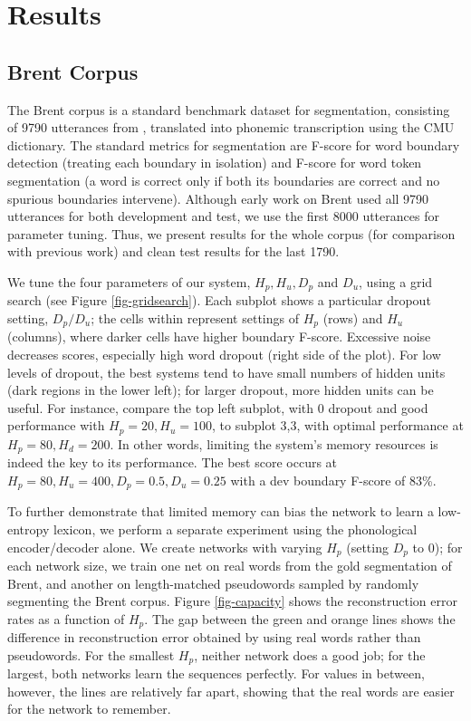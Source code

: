 \documentclass[11pt,letterpaper]{article}
\begin{document}
\section{Results}

\subsection{Brent Corpus}

The Brent corpus \cite{Brent99} is a standard benchmark dataset for
segmentation, consisting of 9790 utterances from
, translated into phonemic transcription using
the CMU dictionary. The standard metrics for segmentation are F-score
for word boundary detection (treating each boundary in isolation) and
F-score for word token segmentation (a word is correct only if both
its boundaries are correct and no spurious boundaries
intervene). Although early work on Brent used all 9790 utterances for
both development and test, we use the first 8000 utterances for
parameter tuning. Thus, we present results for the whole corpus (for
comparison with previous work) and clean test results for the last
1790.


We tune the four parameters of our system, $H_p, H_u, D_p$ and $D_u$,
using a grid search (see Figure \ref{fig-gridsearch}). Each subplot
shows a particular dropout setting, $D_p/D_u$; the cells within
represent settings of $H_p$ (rows) and $H_u$ (columns), where darker
cells have higher boundary F-score. Excessive noise decreases scores,
especially high word dropout (right side of the plot). For low levels
of dropout, the best systems tend to have small numbers of hidden
units (dark regions in the lower left); for larger dropout, more
hidden units can be useful. For instance, compare the top left
subplot, with 0 dropout and good performance with $H_p=20, H_u=100$,
to subplot 3,3, with optimal performance at $H_p=80, H_d=200$. In
other words, limiting the system's memory resources is indeed the key
to its performance. The best score occurs at $H_p=80, H_u=400,
D_p=0.5, D_u=0.25$ with a dev boundary F-score of 83\%.

To further demonstrate that limited memory can bias the network to
learn a low-entropy lexicon, we perform a separate experiment using
the phonological encoder/decoder alone. We create networks with
varying $H_p$ (setting $D_p$ to 0); for each network size, we train
one net on real words from the gold segmentation of Brent, and another
on length-matched pseudowords sampled by randomly segmenting the Brent
corpus. Figure \ref{fig-capacity} shows the reconstruction error rates
as a function of $H_p$. The gap between the green and orange lines
shows the difference in reconstruction error obtained by using real
words rather than pseudowords. For the smallest $H_p$, neither network
does a good job; for the largest, both networks learn the sequences
perfectly. For values in between, however, the lines are relatively
far apart, showing that the real words are easier for the network to
remember.
\end{document}
